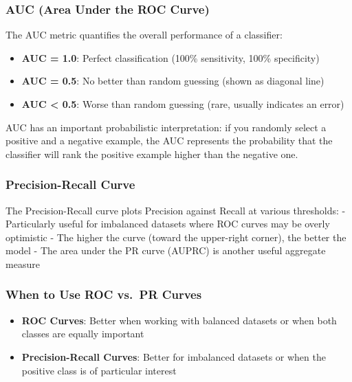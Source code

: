 \documentclass[
  letterpaper,
  DIV=11,
  numbers=noendperiod]{scrreprt}
\providecommand{\tightlist}{%
  \setlength{\itemsep}{0pt}\setlength{\parskip}{0pt}}\usepackage{longtable,booktabs,array}
\begin{document}
\subsubsection{AUC (Area Under the ROC
Curve)}\label{auc-area-under-the-roc-curve}

The AUC metric quantifies the overall performance of a classifier:

\begin{itemize}
\tightlist
\item
  \textbf{AUC = 1.0}: Perfect classification (100\% sensitivity, 100\%
  specificity)
\item
  \textbf{AUC = 0.5}: No better than random guessing (shown as diagonal
  line)
\item
  \textbf{AUC \textless{} 0.5}: Worse than random guessing (rare,
  usually indicates an error)
\end{itemize}

AUC has an important probabilistic interpretation: if you randomly
select a positive and a negative example, the AUC represents the
probability that the classifier will rank the positive example higher
than the negative one.

\subsubsection{Precision-Recall Curve}\label{precision-recall-curve}

The Precision-Recall curve plots Precision against Recall at various
thresholds: - Particularly useful for imbalanced datasets where ROC
curves may be overly optimistic - The higher the curve (toward the
upper-right corner), the better the model - The area under the PR curve
(AUPRC) is another useful aggregate measure

\subsubsection{When to Use ROC vs.~PR
Curves}\label{when-to-use-roc-vs.-pr-curves}

\begin{itemize}
\tightlist
\item
  \textbf{ROC Curves}: Better when working with balanced datasets or
  when both classes are equally important
\item
  \textbf{Precision-Recall Curves}: Better for imbalanced datasets or
  when the positive class is of particular interest
\end{itemize}
\end{document}
